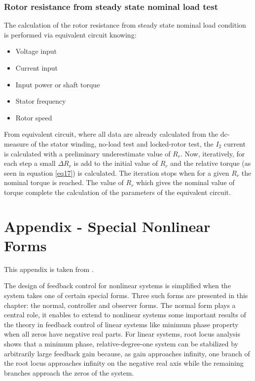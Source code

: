 \documentclass[12pt,a4paper,oneside]{book}
\begin{document}
\begin{onehalfspace}
\subsection{Rotor resistance from steady state nominal load test}
The calculation of the rotor resistance from steady state nominal load condition is performed via equivalent circuit knowing:
\begin{itemize}
	\item Voltage input
	\item Current input
	\item Input power or shaft torque
	\item Stator frequency
	\item Rotor speed
\end{itemize}
From equivalent circuit, where all data are already calculated from the dc-measure of the stator winding, no-load test and locked-rotor test, the $I_2$ current is calculated with a preliminary underestimate value of $R_r$. Now, iteratively, for each step a small $\Delta R_r$ is add to the initial value of $R_r$ and the relative torque (as seen in equation \ref{eq17}) is calculated. The iteration stops when for a given $R_r$ the nominal torque is reached. The value of $R_r$ which gives the nominal value of torque complete the calculation of the parameters of the equivalent circuit.

\chapter{Appendix - Special Nonlinear Forms}
This appendix is taken from \cite{khalil_2}. 

The design of feedback control for nonlinear systems is simplified when the 
system takes one of certain special forms. Three such forms are presented in 
this chapter: the normal, controller and observer forms. The normal form plays 
a central role, it enables to extend to nonlinear systems some important 
results of the theory in feedback control of linear systems like minimum phase 
property when all zeros have negative real parts. For linear systems, root 
locus analysis shows that a minimum phase, relative-degree-one system can be 
stabilized by arbitrarily large feedback gain because, as gain approaches 
infinity, one branch of the root locus approaches infinity on the negative real 
axis while the remaining branches approach the zeros of the system.

\end{onehalfspace}
\end{document}
